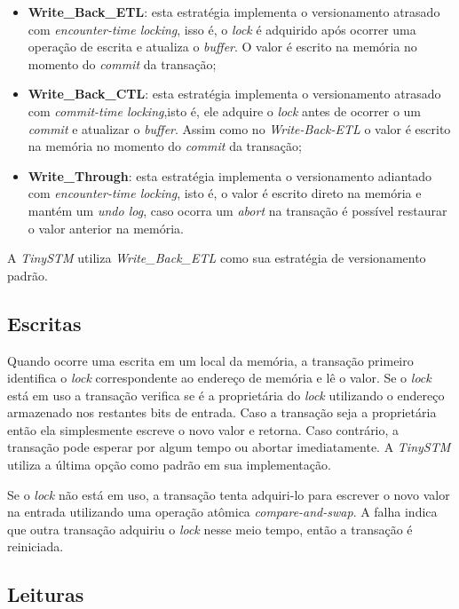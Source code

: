 \documentclass[diss,capa]{texufpel}
\begin{document}
\begin{itemize}
\item \textbf{Write\_Back\_ETL}: esta estratégia implementa o versionamento atrasado com \emph{encounter-time locking}, isso é, o \emph{lock} é adquirido após ocorrer uma operação de escrita e atualiza o \emph{buffer}. O valor é escrito na memória no momento do \emph{commit} da transação;

\item \textbf{Write\_Back\_CTL}: esta estratégia implementa o versionamento atrasado com \emph{commit-time locking},isto é, ele adquire o \emph{lock} antes de ocorrer o um \emph{commit} e atualizar o \emph{buffer}. Assim como no \emph{Write-Back-ETL} o valor é escrito na memória no momento do \emph{commit} da transação;

\item \textbf{Write\_Through}: esta estratégia implementa o versionamento adiantado com \emph{encounter-time locking}, isto é, o valor é escrito direto na memória e mantém um \emph{undo log}, caso ocorra um \emph{abort} na transação é possível restaurar o valor anterior na memória.
\end{itemize}

A \emph{TinySTM} utiliza \emph{Write\_Back\_ETL} como sua estratégia de versionamento padrão.

\subsection{Escritas}

Quando ocorre uma escrita em um local da memória, a transação primeiro identifica o \emph{lock} correspondente ao endereço de memória e lê o valor. Se o \emph{lock} está em uso a transação verifica se é a proprietária do \emph{lock} utilizando o endereço armazenado nos restantes bits de entrada. Caso a transação seja a proprietária então ela simplesmente escreve o novo valor e retorna. Caso contrário, a transação pode esperar por algum tempo ou abortar imediatamente. A \emph{TinySTM} utiliza a última opção como padrão em sua implementação.

Se o \emph{lock} não está em uso, a transação tenta adquiri-lo para escrever o novo valor na entrada utilizando uma operação atômica \emph{compare-and-swap}. A falha indica que outra transação adquiriu o \emph{lock} nesse meio tempo, então a transação é reiniciada.


\subsection{Leituras}
\end{document}
